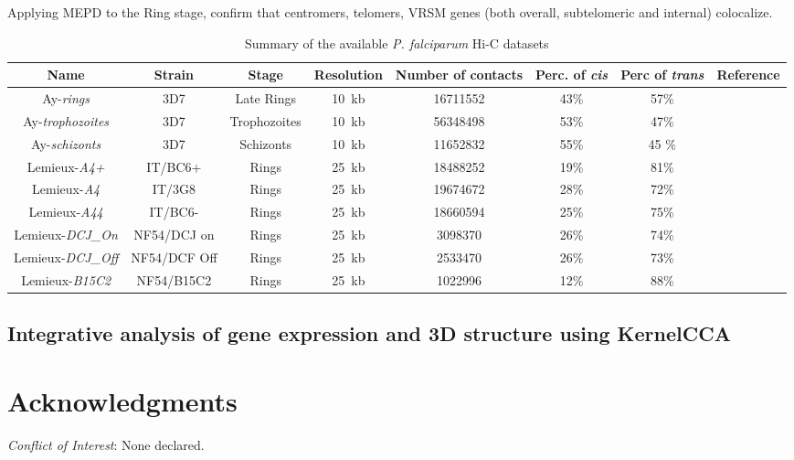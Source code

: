 \documentclass[letterpaper,12pt]{article}
\begin{document}
Applying MEPD to the Ring stage, \citet{capurso:distance-based} confirm that
centromers, telomers, VRSM genes (both overall, subtelomeric and internal)
colocalize.


\begin{table}
\scriptsize
\centering
\begin{tabular}{cccccccc}
\hline
\textbf{Name} & \textbf{Strain} & \textbf{Stage} & \textbf{Resolution} &
\textbf{Number of contacts} & \textbf{Perc. of \textit{cis}} & \textbf{Perc of
\textit{trans}}& \textbf{Reference} \\
\hline
\hline
Ay-\textit{rings} & 3D7 & Late Rings & 10~kb & 16711552 & 43\% & 57\% &  \cite{ay:three-dimensional} \\
Ay-\textit{trophozoites} & 3D7 & Trophozoites &10~kb & 56348498 & 53\% & 47\% & \cite{ay:three-dimensional} \\
Ay-\textit{schizonts} & 3D7 & Schizonts & 10~kb & 11652832 & 55\% & 45 \% & \cite{ay:three-dimensional} \\
Lemieux-\textit{A4+} & IT/BC6+ & Rings & 25~kb & 18488252 & 19\% & 81\% & \cite{lemieux:genome-wide} \\
Lemieux-\textit{A4} & IT/3G8 & Rings &  25~kb & 19674672 & 28\% & 72\% & \cite{lemieux:genome-wide}\\
Lemieux-\textit{A44} & IT/BC6- & Rings & 25~kb & 18660594 & 25\% & 75\% & \cite{lemieux:genome-wide}\\
Lemieux-\textit{DCJ\_On} & NF54/DCJ on & Rings & 25~kb & 3098370 & 26\% & 74\% &\cite{lemieux:genome-wide} \\
Lemieux-\textit{DCJ\_Off} & NF54/DCF Off & Rings & 25~kb & 2533470 & 26\% & 73\% &\cite{lemieux:genome-wide} \\
Lemieux-\textit{B15C2} & NF54/B15C2 & Rings & 25~kb &  1022996 & 12\% & 88\% & \cite{lemieux:genome-wide}\\
\hline
\end{tabular}
\caption{Summary of the available {\em P. falciparum} Hi-C datasets}
\end{table}

\subsection*{Integrative analysis of gene expression and 3D structure using KernelCCA}



\section*{Acknowledgments}

{\it Conflict of Interest}: None declared.






\begin{figure}[!p]
\centering
\caption{}
\label{Fig1}
\end{figure}
\end{document}
